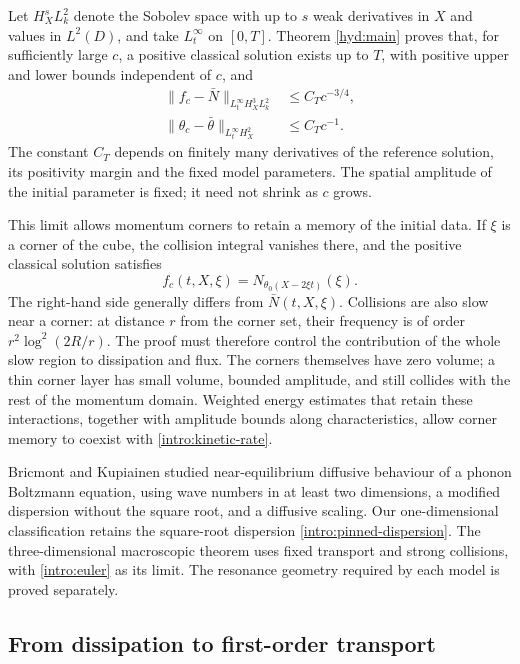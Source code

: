 Let $H_X^sL_k^2$ denote the Sobolev space with up to $s$ weak derivatives
in $X$ and values in $L^2(D)$, and take $L_t^\infty$ on $[0,T]$.
Theorem \ref{hyd:main} proves that, for sufficiently large $c$, a positive
classical solution exists up to $T$, with positive upper and lower bounds
independent of $c$, and
\begin{align}
 \|f_c-\bar N\|_{L_t^\infty H_X^3L_k^2}
 &\le C_Tc^{-3/4},\label{intro:kinetic-rate}\\
 \|\theta_c-\bar\theta\|_{L_t^\infty H_X^2}
 &\le C_Tc^{-1}.\label{intro:macro-rate}
\end{align}
The constant $C_T$ depends on finitely many derivatives of the reference
solution, its positivity margin and the fixed model parameters.
The spatial amplitude of the initial parameter is fixed; it need not
shrink as $c$ grows.

This limit allows momentum corners to retain a memory of the initial data.
If $\xi$ is a corner of the cube, the collision integral vanishes there,
and the positive classical solution satisfies
\begin{equation}\label{intro:corner-memory}
 f_c(t,X,\xi)=N_{\theta_0(X-2\xi t)}(\xi).
\end{equation}
The right-hand side generally differs from $\bar N(t,X,\xi)$.
Collisions are also slow near a corner: at distance $r$ from the corner
set, their frequency is of order $r^2\log^2(2R/r)$.
The proof must therefore control the contribution of the whole slow
region to dissipation and flux. The corners themselves have zero volume;
a thin corner layer has small volume, bounded amplitude, and still
collides with the rest of the momentum domain. Weighted energy estimates
that retain these interactions, together with amplitude bounds along
characteristics, allow corner memory to coexist with
\eqref{intro:kinetic-rate}.

Bricmont and Kupiainen \cite{BK2008} studied near-equilibrium diffusive
behaviour of a phonon Boltzmann equation, using wave numbers in at least
two dimensions, a modified dispersion without the square root, and a
diffusive scaling. Our one-dimensional classification retains the
square-root dispersion \eqref{intro:pinned-dispersion}. The three-dimensional
macroscopic theorem uses fixed transport and strong collisions, with
\eqref{intro:euler} as its limit. The resonance geometry required by each
model is proved separately.

\subsection{From dissipation to first-order transport}

